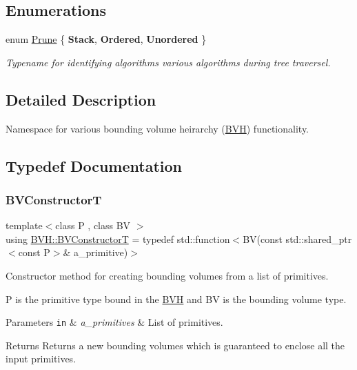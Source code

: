 \subsection*{Enumerations}
\begin{DoxyCompactItemize}
\item 
enum \hyperlink{namespaceBVH_a3ddb7b34ac1deb3baed2f32d9eacbe5b}{Prune} \{ {\bfseries Stack}, 
{\bfseries Ordered}, 
{\bfseries Unordered}
 \}\begin{DoxyCompactList}\small\item\em Typename for identifying algorithms various algorithms during tree traversel. \end{DoxyCompactList}
\end{DoxyCompactItemize}


\subsection{Detailed Description}
Namespace for various bounding volume heirarchy (\hyperlink{namespaceBVH}{B\+VH}) functionality. 

\subsection{Typedef Documentation}
\mbox{\label{namespaceBVH_a245702d7eff40cdaedb5dff68c25a88a}} 
\subsubsection{\texorpdfstring{B\+V\+ConstructorT}{BVConstructorT}}
{\footnotesize\ttfamily template$<$class P , class BV $>$ \\
using \hyperlink{namespaceBVH_a245702d7eff40cdaedb5dff68c25a88a}{B\+V\+H\+::\+B\+V\+ConstructorT} = typedef std\+::function$<$BV(const std\+::shared\+\_\+ptr$<$const P$>$\& a\+\_\+primitive)$>$}



Constructor method for creating bounding volumes from a list of primitives. 

P is the primitive type bound in the \hyperlink{namespaceBVH}{B\+VH} and BV is the bounding volume type. 
\begin{DoxyParams}[1]{Parameters}
\mbox{\tt in}  & {\em a\+\_\+primitives} & List of primitives. \\
\hline
\end{DoxyParams}
\begin{DoxyReturn}{Returns}
Returns a new bounding volumes which is guaranteed to enclose all the input primitives. 
\end{DoxyReturn}
\mbox{\label{namespaceBVH_a7c33d54da9893d506709b2ca96b76f55}} 
